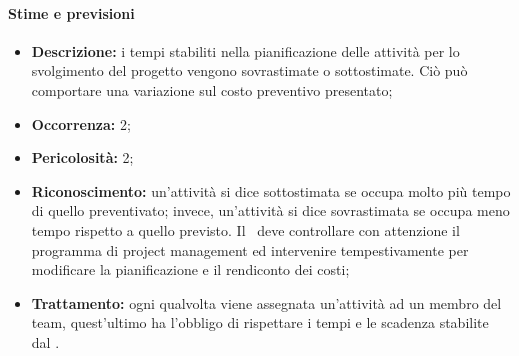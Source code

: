 \paragraph{Stime e previsioni}
\begin{itemize}
	\item \textbf{Descrizione:} i tempi stabiliti nella pianificazione delle attività per lo svolgimento del progetto vengono sovrastimate o sottostimate. Ciò può comportare una variazione sul costo preventivo presentato;
	\item \textbf{Occorrenza:} 2;
	\item \textbf{Pericolosità:} 2;
	\item \textbf{Riconoscimento:} un’attività si dice sottostimata se occupa molto più tempo di quello preventivato; invece, un'attività si dice sovrastimata se occupa meno tempo rispetto a quello previsto. Il \textit{\RdP}\ deve controllare con attenzione il programma di project management ed intervenire tempestivamente per modificare la pianificazione e il rendiconto dei costi;
	\item \textbf{Trattamento:} ogni qualvolta viene assegnata un'attività ad un membro del team, quest'ultimo ha l'obbligo di rispettare i tempi e le scadenza stabilite dal \textit{\RdP}.
\end{itemize}